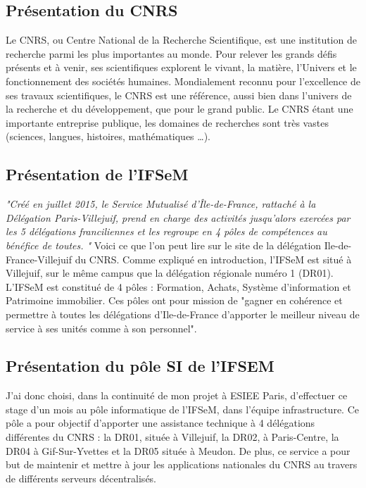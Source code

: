 \subsection{Présentation du CNRS}
Le CNRS, ou Centre National de la Recherche Scientifique, est une institution de recherche parmi les plus importantes au monde. Pour relever les grands défis présents et à venir, ses scientifiques explorent le vivant, la matière, l’Univers et le fonctionnement des sociétés humaines. Mondialement reconnu pour l’excellence de ses travaux scientifiques, le CNRS est une référence, aussi bien dans l’univers de la recherche et du développement, que pour le grand public. Le CNRS étant une importante entreprise publique, les domaines de recherches sont très vastes (sciences, langues, histoires, mathématiques \ldots). 

\subsection{Présentation de l'IFSeM}
\textit{"Créé en juillet 2015, le Service Mutualisé d’Île-de-France, rattaché à la Délégation Paris-Villejuif, prend en charge des activités jusqu’alors exercées par les 5 délégations franciliennes et les regroupe en 4 pôles de compétences au bénéfice de toutes\footnotemark. "}
\smallbreak
Voici ce que l'on peut lire sur le site de la délégation Ile-de-France-Villejuif du CNRS. Comme expliqué en introduction, l'IFSeM est situé à Villejuif, sur le même campus que la délégation régionale numéro 1 (DR01). L'IFSeM est constitué de 4 pôles : Formation, Achats, Système d'information et Patrimoine immobilier. Ces pôles ont pour mission de "gagner en cohérence et permettre à toutes les délégations d'Ile-de-France d’apporter le meilleur niveau de service à ses unités comme à son personnel".

\subsection{Présentation du pôle SI de l'IFSEM}
J'ai donc choisi, dans la continuité de mon projet à ESIEE Paris, d'effectuer ce stage d'un mois au pôle informatique de l'IFSeM, dans l'équipe infrastructure. 
Ce pôle a pour objectif d'apporter une assistance technique à 4 délégations différentes du CNRS : la DR01, située à Villejuif, la DR02, à Paris-Centre, la DR04 à Gif-Sur-Yvettes et la DR05 située à Meudon. De plus, ce service a pour but de maintenir et mettre à jour les applications nationales du CNRS au travers de différents serveurs décentralisés. 
\newpage
